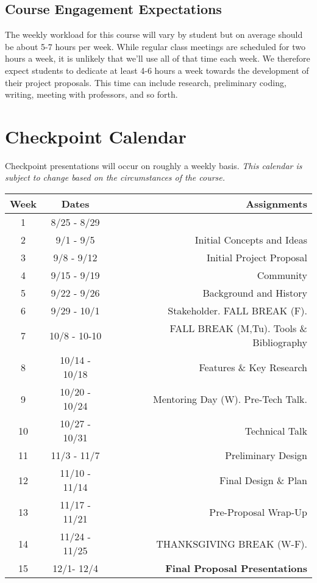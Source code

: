 \documentclass[10pt]{article}
\begin{document}
\subsection{Course Engagement Expectations}

The weekly workload for this course will vary by student but on average should be about 5-7 hours per week.  While regular class meetings are scheduled for two hours a week, it is unlikely that we'll use all of that time each week.  We therefore expect students to dedicate at least 4-6 hours a week towards the development of their project proposals.  This time can include research, preliminary coding, writing, meeting with professors, and so forth.


\section{Checkpoint Calendar}

Checkpoint presentations will occur on roughly a weekly basis. \textit{This calendar is subject to change based on the circumstances of the course.}
\begin{center}
\begin{tabular}{|c|c|r|}
\hline 
Week & Dates & Assignments \\
\hline
1 & 8/25 - 8/29 &  \\
\hline 
2 & 9/1 - 9/5 &  Initial Concepts and Ideas \\
\hline
3 & 9/8 - 9/12 & Initial Project Proposal   \\
\hline
4 & 9/15 - 9/19 & Community \\
\hline
5 & 9/22 - 9/26 & Background and History \\
\hline
6 & 9/29 - 10/1 & Stakeholder. FALL BREAK (F). \\
\hline
7 & 10/8 - 10-10  & FALL BREAK (M,Tu). Tools \& Bibliography   \\
\hline 
8 & 10/14 - 10/18 & Features \& Key Research \\
\hline
9 & 10/20 - 10/24 & Mentoring Day (W). Pre-Tech Talk.\\
\hline
10 & 10/27 - 10/31 & Technical Talk \\
\hline
11 & 11/3 - 11/7 & Preliminary Design\\
\hline
12 & 11/10 - 11/14 & Final Design \& Plan \\
\hline
13 & 11/17 - 11/21 & Pre-Proposal Wrap-Up\\
\hline
14 & 11/24 - 11/25 &  THANKSGIVING BREAK (W-F).   \\
\hline
15 & 12/1- 12/4 & \textbf{Final Proposal Presentations}\\ 
\hline
\end{tabular}
\end{center}
\end{document}
